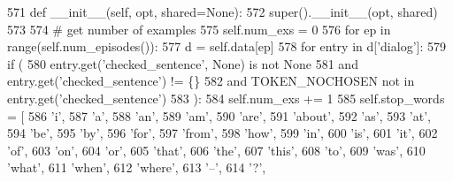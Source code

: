 \begin{DoxyCode}
571     \textcolor{keyword}{def }\_\_init\_\_(self, opt, shared=None):
572         super().\_\_init\_\_(opt, shared)
573 
574         \textcolor{comment}{# get number of examples}
575         self.num\_exs = 0
576         \textcolor{keywordflow}{for} ep \textcolor{keywordflow}{in} range(self.num\_episodes()):
577             d = self.data[ep]
578             \textcolor{keywordflow}{for} entry \textcolor{keywordflow}{in} d[\textcolor{stringliteral}{'dialog'}]:
579                 \textcolor{keywordflow}{if} (
580                     entry.get(\textcolor{stringliteral}{'checked\_sentence'}, \textcolor{keywordtype}{None}) \textcolor{keywordflow}{is} \textcolor{keywordflow}{not} \textcolor{keywordtype}{None}
581                     \textcolor{keywordflow}{and} entry.get(\textcolor{stringliteral}{'checked\_sentence'}) != \{\}
582                     \textcolor{keywordflow}{and} TOKEN\_NOCHOSEN \textcolor{keywordflow}{not} \textcolor{keywordflow}{in} entry.get(\textcolor{stringliteral}{'checked\_sentence'})
583                 ):
584                     self.num\_exs += 1
585         self.stop\_words = [
586             \textcolor{stringliteral}{'i'},
587             \textcolor{stringliteral}{'a'},
588             \textcolor{stringliteral}{'an'},
589             \textcolor{stringliteral}{'am'},
590             \textcolor{stringliteral}{'are'},
591             \textcolor{stringliteral}{'about'},
592             \textcolor{stringliteral}{'as'},
593             \textcolor{stringliteral}{'at'},
594             \textcolor{stringliteral}{'be'},
595             \textcolor{stringliteral}{'by'},
596             \textcolor{stringliteral}{'for'},
597             \textcolor{stringliteral}{'from'},
598             \textcolor{stringliteral}{'how'},
599             \textcolor{stringliteral}{'in'},
600             \textcolor{stringliteral}{'is'},
601             \textcolor{stringliteral}{'it'},
602             \textcolor{stringliteral}{'of'},
603             \textcolor{stringliteral}{'on'},
604             \textcolor{stringliteral}{'or'},
605             \textcolor{stringliteral}{'that'},
606             \textcolor{stringliteral}{'the'},
607             \textcolor{stringliteral}{'this'},
608             \textcolor{stringliteral}{'to'},
609             \textcolor{stringliteral}{'was'},
610             \textcolor{stringliteral}{'what'},
611             \textcolor{stringliteral}{'when'},
612             \textcolor{stringliteral}{'where'},
613             \textcolor{stringliteral}{'--'},
614             \textcolor{stringliteral}{'?'},

\end{DoxyCode}

